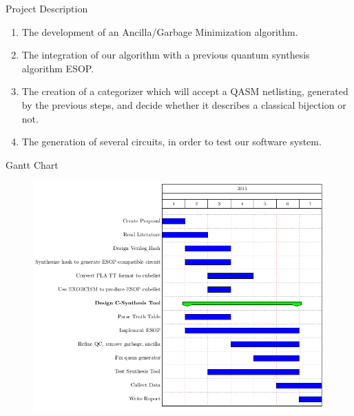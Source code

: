 \documentclass[pdf]{beamer}
\begin{document}
\begin{frame}{Project Description}
\begin{enumerate}
    \item The development of an Ancilla/Garbage Minimization algorithm.
    \item The integration of our algorithm with a previous quantum synthesis algorithm ESOP.
    \item The creation of a categorizer which will accept a QASM netlisting, generated by the previous steps, and decide whether it describes a classical bijection or not. 
    \item The generation of several circuits, in order to test our software system. 
\end{enumerate}
\end{frame}

\begin{frame}{Gantt Chart}

\begin{figure}[ht]
\begin{center}
\hspace{-4em}
  \includegraphics[scale=0.35]{figures/our_gantt.png}
\end{center}
\end{figure}

\end{frame}
\end{document}
